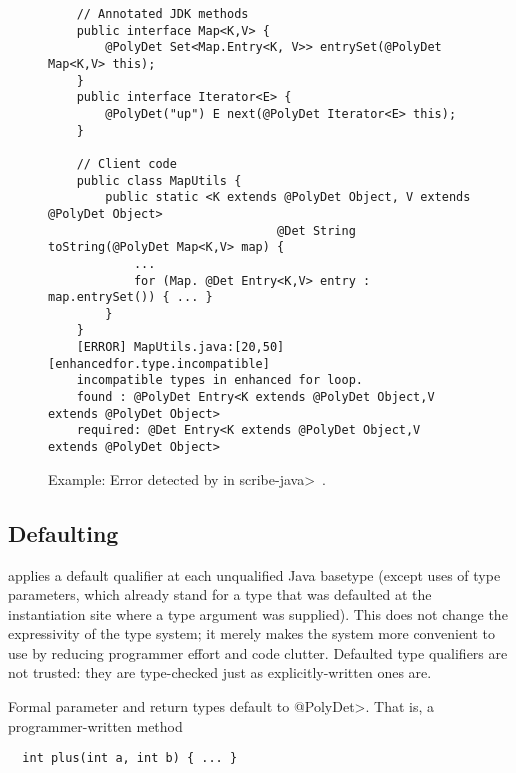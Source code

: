 \begin{figure}
    \begin{verbatim}
    // Annotated JDK methods
    public interface Map<K,V> {
        @PolyDet Set<Map.Entry<K, V>> entrySet(@PolyDet Map<K,V> this);
    }
    public interface Iterator<E> {
        @PolyDet("up") E next(@PolyDet Iterator<E> this);
    }
    
    // Client code
    public class MapUtils {
        public static <K extends @PolyDet Object, V extends @PolyDet Object> 
                                @Det String toString(@PolyDet Map<K,V> map) {
            ...
            for (Map. @Det Entry<K,V> entry : map.entrySet()) { ... }
        }
    }
    [ERROR] MapUtils.java:[20,50] [enhancedfor.type.incompatible] 
    incompatible types in enhanced for loop.
    found : @PolyDet Entry<K extends @PolyDet Object,V extends @PolyDet Object>
    required: @Det Entry<K extends @PolyDet Object,V extends @PolyDet Object>
    \end{verbatim}
    \caption{Example: Error detected by \theDeterminismChecker in \<scribe-java>~\cite{nondex}.}
    \label{code-determinism}
\end{figure}


\subsection{Defaulting}\label{defaulting}

\TheDeterminismChecker applies a default qualifier at each unqualified Java
basetype (except uses of type parameters, which already stand for a type that was
defaulted at the instantiation site where a type argument was supplied).
This does not change the expressivity of the type system; it merely makes
the system more convenient to use by reducing programmer effort and code clutter.
Defaulted type qualifiers are not trusted:  they are type-checked just as
explicitly-written ones are.

Formal parameter and return types default to \<@PolyDet>.  That is, a
programmer-written method

\begin{Verbatim}
  int plus(int a, int b) { ... }
\end{Verbatim}

